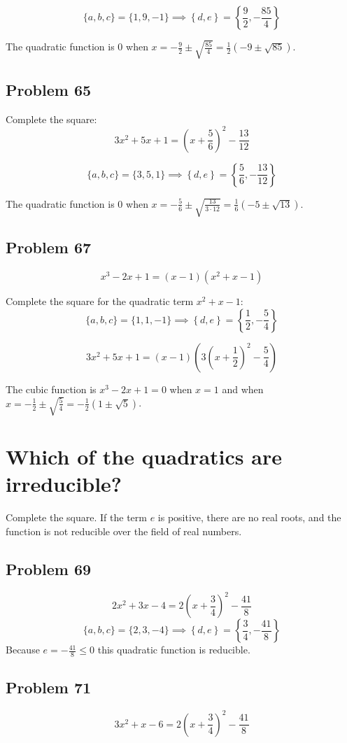 \documentclass[11pt, oneside]{article}   	%
\begin{document}
$$\{a,b,c\}=\{1, 9, -1\} \implies \left\{d,e\right\} = \left\{\frac{9}{2},-\frac{85}{4}\right\}$$

\noindent The quadratic function is $0$ when $x=-\frac{9}{2}\pm\sqrt{\frac{85}{4}} = \frac{1}{2}\left(-9\pm\sqrt{85}\right)$.

\subsection{Problem 65}
Complete the square:
$$3 x^2+5 x+1 = \left(x+\frac{5}{6}\right)^2 -\frac{13}{12}$$

$$\{a,b,c\}=\{3, 5, 1\} \implies \left\{d,e\right\} = \left\{\frac{5}{6},-\frac{13}{12}\right\}$$

\noindent The quadratic function is $0$ when $x=-\frac{5}{6}\pm\sqrt{\frac{13}{3\cdot12}} = \frac{1}{6}\left(-5\pm\sqrt{13}\right)$.

\subsection{Problem 67}
$$x^3-2 x+1 = (x-1) \left(x^2+x-1\right)$$

Complete the square for the quadratic term $x^2+x-1$:
$$\{a,b,c\}=\{1, 1, -1\} \implies \left\{d,e\right\} = \left\{\frac{1}{2},-\frac{5}{4}\right\}$$

$$3 x^2+5 x+1 = (x-1) \left( 3\left(x+\frac{1}{2}\right)^2 -\frac{5}{4} \right)$$

\noindent The cubic function is $x^3-2 x+1=0$ when $x=1$ and when $x=-\frac{1}{2}\pm\sqrt{\frac{5}{4}} = -\frac{1}{2}\left(1\pm\sqrt{5}\right)$.


\section{Which of the quadratics are irreducible?}
Complete the square. If the term $e$ is positive, there are no real roots, and the function is not reducible over the field of real numbers.

\subsection{Problem 69}
$$2 x^2+ 3 x -4 = 2 \left(x+\frac{3}{4}\right)^2-\frac{41}{8}$$ 
$$\{a,b,c\}=\{2, 3, -4\} \implies \left\{d,e\right\} = \left\{\frac{3}{4},-\frac{41}{8}\right\}$$
\noindent Because $e=-\frac{41}{8} \le0$ this quadratic function is reducible.

\subsection{Problem 71}
$$3 x^2+x-6 = 2 \left(x+\frac{3}{4}\right)^2-\frac{41}{8}$$ 
\end{document}

